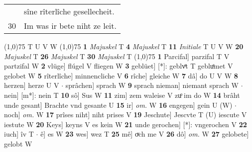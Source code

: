\documentclass[8pt,a4paper,notitlepage]{article}
\begin{document}
\begin{table}[ht]
\begin{minipage}[t]{0.5\linewidth}
\begin{tabular}{rl}
 & sîne rîterlîche gesellecheit.\\ 
30 & Im was ir bete niht ze leit.\\ 
\end{tabular}
\scriptsize
\line(1,0){75} \newline
T U V W \newline
\line(1,0){75} \newline
\textbf{1} \textit{Majuskel} T  \textbf{4} \textit{Majuskel} T  \textbf{11} \textit{Initiale} T U V W  \textbf{20} \textit{Majuskel} T  \textbf{26} \textit{Majuskel} T  \textbf{30} \textit{Majuskel} T  \newline
\line(1,0){75} \newline
\textbf{1} Parcifal] parzifal T V partzifal W \textbf{2} vlüge] flúgel V fliegen W \textbf{3} geblüet] [*]: geblvͤt T gebluͤmet V gelobet W \textbf{5} rîterlîche] minnencliche V \textbf{6} rîche] gleiche W \textbf{7} dâ] do U V W \textbf{8} herzen] herze U V  $\cdot$ sprâchen] sprach W \textbf{9} sprach nieman] niemant sprach W  $\cdot$ nein] [m*]: nein T \textbf{10} sô] Sus W \textbf{11} zim] zem waleise V zuͦ im do W \textbf{14} brâht unde gesant] Brachte vnd gesante U \textbf{15} ir] \textit{om.} W \textbf{16} engegen] gein U (W)  $\cdot$ noch] \textit{om.} W \textbf{17} prîses niht] niht prises V \textbf{19} Jeschute] Jescvte T (U) iescute V iestute W \textbf{20} Keys] keyns V es kein W \textbf{21} unde gerochen] [*]: vngerochen V \textbf{22} iuch] îv T  $\cdot$ ê] es W \textbf{23} wes] wez T \textbf{25} mê] oͮch me V \textbf{26} dô] \textit{om.} W \textbf{27} gelobete] gelobt W \newline
\end{minipage}
\end{table}
\end{document}

